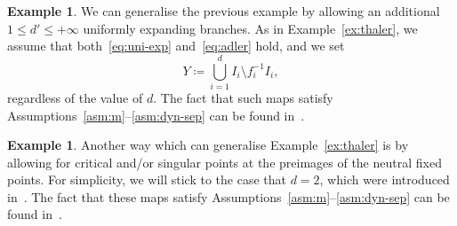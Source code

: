 \documentclass[english, 10pt]{amsart}
\numberwithin{equation}{section}
\theoremstyle{definition}
\theoremstyle{plain}
\theoremstyle{plain}
\theoremstyle{definition}
\theoremstyle{definition}
\newtheorem{example}[definition]{Example}
\theoremstyle{plain}
\theoremstyle{definition}
\newcommand{\eqdef}{\coloneqq}
\numberwithin{equation}{section}
\begin{document}
\begin{example}
  We can generalise the previous example by allowing an additional $1 \le d' \le +\infty$ uniformly expanding branches.   As in Example~\ref{ex:thaler}, we assume that both~\eqref{eq:uni-exp} and~\eqref{eq:adler} hold, and we set
  \[
    Y \eqdef
    \bigcup_{ i = 1 }^{ d } I_i \setminus f_{i}^{-1} I_i
    ,
  \]
  regardless of the value of $d$. 
  The fact that such maps satisfy Assumptions~\ref{asm:m}--\ref{asm:dyn-sep} can be found in~\cite[Example 5.14]{CoaMel2025-sub}.
\end{example}

\begin{example}
  \label{ex:d+D}
  Another way which can generalise Example~\ref{ex:thaler} is by allowing for critical and/or singular points at the preimages of the neutral fixed points. For simplicity, we will stick to the case that $d = 2$, which were introduced in~\cite{CoaLuzMuh2023}.
  The fact that these maps satisfy Assumptions~\ref{asm:m}--\ref{asm:dyn-sep} can be found in~\cite[Setion 4.2]{CoaMelTal:2024}.
\end{example}



\end{document}
